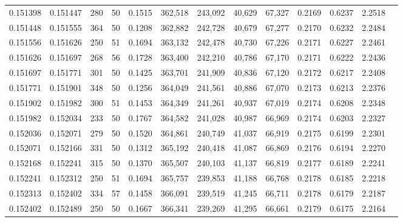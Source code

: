 \begin{tabular}{rrrrrrrrrrrrr}
0.151398 & 0.151447 &   280 &  50 &                                     0.1515 & 362,518 & 243,092 &  40,629 &  67,327 & 0.2169 & 0.6237 & 2.2518 \\
0.151448 & 0.151555 &   364 &  50 &                                     0.1208 & 362,882 & 242,728 &  40,679 &  67,277 & 0.2170 & 0.6232 & 2.2484 \\
0.151556 & 0.151626 &   250 &  51 &                                     0.1694 & 363,132 & 242,478 &  40,730 &  67,226 & 0.2171 & 0.6227 & 2.2461 \\
0.151626 & 0.151697 &   268 &  56 &                                     0.1728 & 363,400 & 242,210 &  40,786 &  67,170 & 0.2171 & 0.6222 & 2.2436 \\
0.151697 & 0.151771 &   301 &  50 &                                     0.1425 & 363,701 & 241,909 &  40,836 &  67,120 & 0.2172 & 0.6217 & 2.2408 \\
0.151771 & 0.151901 &   348 &  50 &                                     0.1256 & 364,049 & 241,561 &  40,886 &  67,070 & 0.2173 & 0.6213 & 2.2376 \\
0.151902 & 0.151982 &   300 &  51 &                                     0.1453 & 364,349 & 241,261 &  40,937 &  67,019 & 0.2174 & 0.6208 & 2.2348 \\
0.151982 & 0.152034 &   233 &  50 &                                     0.1767 & 364,582 & 241,028 &  40,987 &  66,969 & 0.2174 & 0.6203 & 2.2327 \\
0.152036 & 0.152071 &   279 &  50 &                                     0.1520 & 364,861 & 240,749 &  41,037 &  66,919 & 0.2175 & 0.6199 & 2.2301 \\
0.152071 & 0.152166 &   331 &  50 &                                     0.1312 & 365,192 & 240,418 &  41,087 &  66,869 & 0.2176 & 0.6194 & 2.2270 \\
0.152168 & 0.152241 &   315 &  50 &                                     0.1370 & 365,507 & 240,103 &  41,137 &  66,819 & 0.2177 & 0.6189 & 2.2241 \\
0.152241 & 0.152312 &   250 &  51 &                                     0.1694 & 365,757 & 239,853 &  41,188 &  66,768 & 0.2178 & 0.6185 & 2.2218 \\
0.152313 & 0.152402 &   334 &  57 &                                     0.1458 & 366,091 & 239,519 &  41,245 &  66,711 & 0.2178 & 0.6179 & 2.2187 \\
0.152402 & 0.152489 &   250 &  50 &                                     0.1667 & 366,341 & 239,269 &  41,295 &  66,661 & 0.2179 & 0.6175 & 2.2164 \\

\end{tabular}
